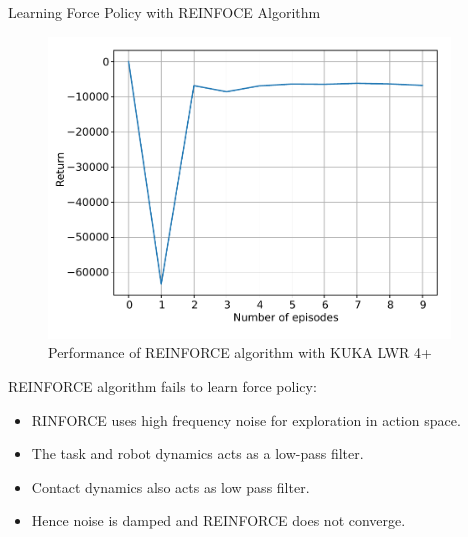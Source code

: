 \documentclass[aspectratio=169]{beamer}
\begin{document}
\begin{frame}
	Learning Force Policy with REINFOCE Algorithm
	\begin{minipage}[t]{0.51\textwidth}
		\begin{figure}
			\includegraphics[width=0.95\textwidth]{images/exp/cut/reinf_returnn}
			\caption{\scriptsize Performance of REINFORCE algorithm with KUKA LWR 4+}
		\end{figure}
	\end{minipage}
	\hfill
	\begin{minipage}[t]{0.47\textwidth}
		\vspace{0.5cm}
		REINFORCE algorithm fails to learn force policy:
		\begin{itemize}
			\small
			\item RINFORCE uses high frequency noise for exploration in action space.
			\item The task and robot dynamics acts as a low-pass filter.
			\item Contact dynamics also acts as low pass filter.
			\item Hence noise is damped and REINFORCE does not converge.
		\end{itemize}
	\end{minipage}
\end{frame}
\end{document}
